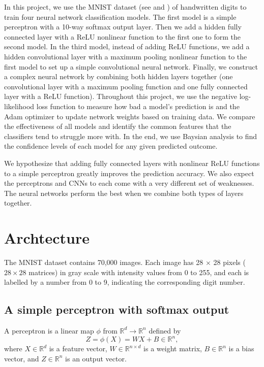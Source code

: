 \documentclass[11pt]{amsart}
\begin{document}
In this project, we use the MNIST dataset (see \cite{LCB} and \cite{BSI}) of handwritten digits to train four neural network classification models. The first model is a simple perceptron with a 10-way softmax output layer. Then we add a hidden fully connected layer with a ReLU nonlinear function to the first one to form the second model. In the third model, instead of adding ReLU functions, we add a hidden convolutional layer with a maximum pooling nonlinear function to the first model to set up a simple convolutional neural network. Finally, we construct a complex neural network by combining both hidden layers together (one convolutional layer with a maximum pooling function and one fully connected layer with a ReLU function). Throughout this project, we use the negative log-likelihood loss function to measure how bad a model's prediction is and the Adam optimizer to update network weights based on training data.  We compare the effectiveness of all models and identify the common features that the classifiers tend to struggle more with. In the end, we use Baysian analysis to find the confidence levels of each model for any given predicted outcome.


We hypothesize that adding fully connected layers with nonlinear ReLU functions to a simple perceptron greatly improves the prediction accuracy. We also expect the perceptrons and CNNs to each come with a very different set of weaknesses. The neural networks perform the best when we combine both types of layers together.

\section{Archtecture}

The MNIST dataset  contains 70,000 images. Each image has 28 $\times$ 28 pixels ($28\times 28$ matrices) in gray scale with intensity values from 0 to 255, and each is labelled by a number from 0 to 9, indicating the corresponding digit number.

\subsection{A simple perceptron with softmax output}

A perceptron is a linear map $\phi$ from $\mathbb{R}^{d} \to \mathbb{R}^n$ defined by
$$
Z=\phi(X) = WX  + B \in \mathbb{R}^n,
$$
where $X\in \mathbb{R}^{d}$ is a feature vector, $W\in \mathbb{R}^{n\times d}$ is a weight matrix, $B\in \mathbb{R}^n$ is a bias vector, and $Z\in \mathbb{R}^n$ is an output vector.
\end{document}

